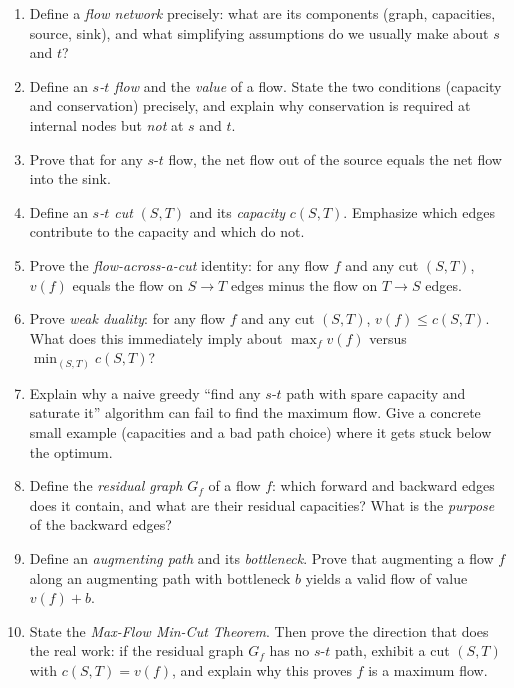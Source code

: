 \documentclass[11pt]{article}
\begin{document}
\begin{enumerate}[label=\textbf{A\arabic*.}, leftmargin=2.2em]

\item Define a \emph{flow network} precisely: what are its components (graph, capacities,
source, sink), and what simplifying assumptions do we usually make about $s$ and $t$?

\item Define an \emph{$s$-$t$ flow} and the \emph{value} of a flow. State the two
conditions (capacity and conservation) precisely, and explain why conservation is required
at internal nodes but \emph{not} at $s$ and $t$.

\item Prove that for any $s$-$t$ flow, the net flow out of the source equals the net flow
into the sink.

\item Define an \emph{$s$-$t$ cut} $(S,T)$ and its \emph{capacity} $c(S,T)$. Emphasize
which edges contribute to the capacity and which do not.

\item Prove the \emph{flow-across-a-cut} identity: for any flow $f$ and any cut $(S,T)$,
$v(f)$ equals the flow on $S \to T$ edges minus the flow on $T \to S$ edges.

\item Prove \emph{weak duality}: for any flow $f$ and any cut $(S,T)$, $v(f) \le c(S,T)$.
What does this immediately imply about $\max_f v(f)$ versus $\min_{(S,T)} c(S,T)$?

\item Explain why a naive greedy ``find any $s$-$t$ path with spare capacity and saturate
it'' algorithm can fail to find the maximum flow. Give a concrete small example (capacities
and a bad path choice) where it gets stuck below the optimum.

\item Define the \emph{residual graph} $G_f$ of a flow $f$: which forward and backward
edges does it contain, and what are their residual capacities? What is the \emph{purpose}
of the backward edges?

\item Define an \emph{augmenting path} and its \emph{bottleneck}. Prove that augmenting a
flow $f$ along an augmenting path with bottleneck $b$ yields a valid flow of value
$v(f) + b$.

\item State the \emph{Max-Flow Min-Cut Theorem}. Then prove the direction that does the
real work: if the residual graph $G_f$ has no $s$-$t$ path, exhibit a cut $(S,T)$ with
$c(S,T) = v(f)$, and explain why this proves $f$ is a maximum flow.


\end{enumerate}
\end{document}
